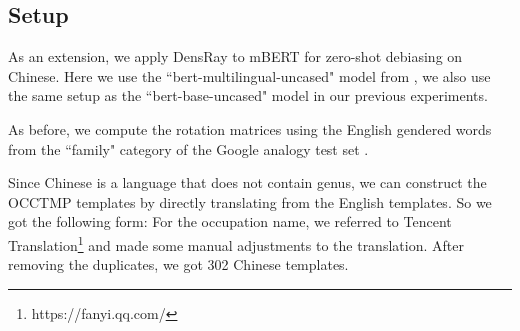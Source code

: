 \subsection{Setup}
As an extension, we apply DensRay to mBERT for zero-shot debiasing on Chinese. Here we use the ``bert-multilingual-uncased" model from \citep{wolf2019huggingfaces}, we also use the same setup as the ``bert-base-uncased" model in our previous experiments. 

As before, we compute the rotation matrices using the English gendered words from the ``family" category of the Google analogy test set \citep{mikolov2013efficient}.

Since Chinese is a language that does not contain genus, we can construct the OCCTMP templates by directly translating from the English templates. So we got the following form:  For the occupation name, we referred to Tencent Translation\footnote{https://fanyi.qq.com/} and made some manual adjustments to the translation. After removing the duplicates, we got 302 Chinese templates.

